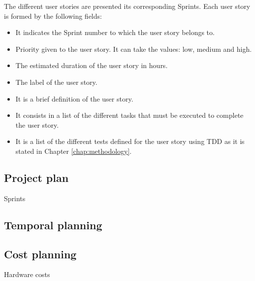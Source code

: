 The different user stories are presented its corresponding Sprints. Each user story is formed by the following fields:
\begin{itemize}
	\item {} It indicates the Sprint number to which the user story belongs to.
	\item {} Priority given to the user story. It can take the values: low, medium and high.
	\item {} The estimated duration of the user story in hours. 
	\item {} The label of the user story.
	\item {} It is a brief definition of the user story.
	\item {} It consists in a list of the different tasks that must be executed to complete the user story.
	\item {} It is a list of the different tests defined for the user story using \ac{TDD} as it is stated in Chapter \ref{chap:methodology}.
\end{itemize}

\subsection{Project plan}
\begin{table}[hp]
	\centering
	{\small
		
	}
	\caption{Sprints}
	\label{tab:Sprints}
\end{table}

\subsection{Temporal planning}



\subsection{Cost planning}
\begin{table}[hp]
	\centering
	{\small
		
	}
	\caption{Hardware costs}
	\label{tab:Hardware-Costs}
\end{table}


